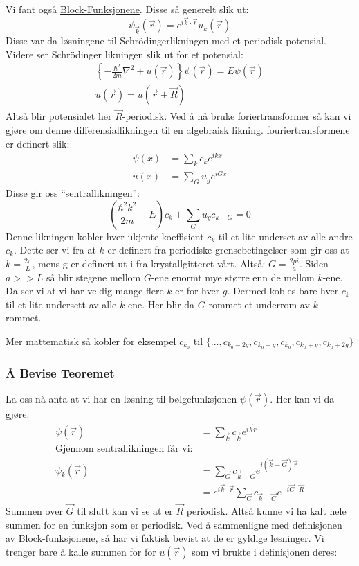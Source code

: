 \documentclass{article}
\begin{document}
Vi fant også \underline{Block-Funksjonene}. Disse så generelt slik ut:
\begin{equation}
  \label{eq:block_funksjoner}
  \psi_{\vec{k}}(\vec{r}) = e^{i\vec{k}\cdot\vec{r}}u_k(\vec{r})
\end{equation}
Disse var da løsningene til Schrödingerlikningen med et periodisk potensial.
Videre ser Schrödinger likningen slik ut for et potensial:
\begin{align}
  \label{eq:schrödinger_likningen_med_periodisk_potensial}
  \left\{  -\frac{\hbar^2}{2m}\nabla^2 + u(\vec{r})  \right\}\psi(\vec{r}) = E\psi(\vec{r}) \\
  u(\vec{r}) = u(\vec{r} + \vec{R})
\end{align}
Altså blir potensialet her $\vec{R}$-periodisk. Ved å nå bruke foriertransformer så kan vi gjøre om denne differensiallikningen til en algebraisk likning. fouriertransformene er definert slik:
\begin{align*}
  \psi(x) &= \sum_k c_k e^{ikx} \\
  u(x) &= \sum_G u_g e^{iGx}
\end{align*}
Disse gir oss \enquote{sentrallikningen}:
\begin{equation}
  \label{eq:den_sentrale_likningen}
  \left(\frac{\hbar^2 k^2}{2m} - E\right)c_k + \sum_G u_g c_{k-G} = 0
\end{equation}
Denne likningen kobler hver ukjente koeffisient $c_k$ til et lite underset av alle andre $c_k$. Dette ser vi fra at $k$ er definert fra periodiske grensebetingelser som gir oss at $k = \frac{2\pi}{L}$, mens g er definert ut i fra krystallgitteret vårt. Altså: $G = \frac{2pi}{a}$. Siden $a >> L$ så blir stegene mellom $G$-ene enormt mye større enn de mellom $k$-ene. Da ser vi at vi har veldig mange flere $k$-er for hver $g$. Dermed kobles bare hver $c_k$ til et lite undersett av alle $k$-ene. Her blir da $G$-rommet et underrom av $k$-rommet.

Mer mattematisk så kobler for eksempel $c_{k_0}$ til $\{..., c_{k_0 - 2g}, c_{k_0 - g}, c_{k_0}, c_{k_0 + g}, c_{k_0 + 2g}\}$

\subsubsection{Å Bevise Teoremet}
La oss nå anta at vi har en løsning til bølgefunksjonen $\psi(\vec{r})$.
Her kan vi da gjøre:
\begin{align*}
  \psi(\vec{r}) &= \sum_{\vec{k}} c_{\vec{k}} e^{i \vec{k} {r}} \\
  \text{Gjennom sentrallikningen får vi:} \\
   \psi_k(\vec{r})&= \sum_{\vec{G}} c_{\vec{k} - \vec{G}} e^{i(\vec{k} - \vec{G}) 
   \vec{r}} \\
   &= e^{i\vec{k}\cdot\vec{r}} \sum_{\vec{G}}  c_{\vec{k} - \vec{G}}e^{-i \vec{G}\cdot\vec{R}}
\end{align*}
Summen over $\vec{G}$ til slutt kan vi se at er $\vec{R}$ periodisk. Altså kunne vi ha kalt hele summen for en funksjon som er periodisk. Ved å sammenligne med definisjonen av Block-funksjonene, så har vi faktisk bevist at de er gyldige løsninger. Vi trenger bare å kalle summen for for $u(\vec{r})$ som vi brukte i definisjonen deres: 
\end{document}
